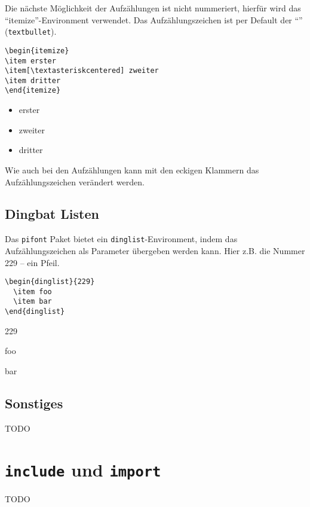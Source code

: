 Die nächste Möglichkeit der Aufzählungen ist nicht nummeriert, hierfür wird das "`itemize"'-Environment verwendet. Das Aufzählungszeichen ist per Default der "`\textbullet"' (\texttt{textbullet}).
\begin{verbatim}
\begin{itemize}
\item erster
\item[\textasteriskcentered] zweiter
\item dritter
\end{itemize}
\end{verbatim}

\begin{itemize}
\item erster
\item[\textasteriskcentered] zweiter
\item dritter
\end{itemize}
Wie auch bei den Aufzählungen kann mit den eckigen Klammern das Aufzählungszeichen verändert werden. 

\subsection{Dingbat Listen}

Das \texttt{pifont} Paket bietet ein \texttt{dinglist}-Environment, indem das Aufzählungszeichen als Parameter übergeben werden kann. Hier z.B. die Nummer 229 -- ein Pfeil.

\begin{verbatim}
\begin{dinglist}{229}
  \item foo
  \item bar
\end{dinglist}
\end{verbatim}

\begin{dinglist}{229}
  \item foo
  \item bar
\end{dinglist}

\subsection{Sonstiges}

TODO

\section{\texttt{include} und \texttt{import}}\label{sect:import}

TODO

